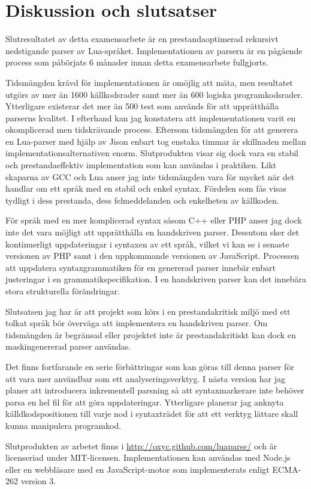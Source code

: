\section{Diskussion och slutsatser}

Slutresultatet av detta examensarbete är en prestandaoptimerad rekursivt
nedstigande parser av Lua-språket. Implementationen av parsern är en pågående
process som påbörjats 6 månader innan detta examensarbete fullgjorts.

Tidsmängden krävd för implementationen är omöjlig att mäta, men resultatet
utgörs av mer än 1600 källkodsrader samt mer än 600 logiska programkodsrader.
Ytterligare existerar det mer än 500 test som används för att upprätthålla
parserns kvalitet. I efterhand kan jag konstatera att implementationen varit
en okomplicerad men tidskrävande process. Eftersom tidsmängden för att
generera en Lua-parser med hjälp av Jison enbart tog enstaka timmar är
skillnaden mellan implementationsalternativen enorm. Slutprodukten visar sig
dock vara en stabil och prestandaeffektiv implementation som kan användas i
praktiken. Likt skaparna av GCC och Lua anser jag inte tidsmängden vara för
mycket när det handlar om ett språk med en stabil och enkel syntax. Fördelen
som fås visas tydligt i dess prestanda, dess felmeddelanden och enkelheten av
källkoden.

För språk med en mer komplicerad syntax såsom C++ eller PHP anser jag dock
inte det vara möjligt att upprätthålla en handskriven parser. Dessutom sker
det kontinuerligt uppdateringar i syntaxen av ett språk, vilket vi kan se i
senaste versionen av PHP samt i den uppkommande versionen av JavaScript.
Processen att uppdatera syntaxgrammatiken för en genererad parser innebär
enbart justeringar i en grammatikspecifikation. I en handskriven parser kan
det innebära stora strukturella förändringar.

Slutsatsen jag har är att projekt som körs i en prestandakritisk miljö med ett
tolkat språk bör överväga att implementera en handskriven parser. Om
tidsmängden är begränsad eller projektet inte är prestandakritiskt kan dock en
maskingenererad parser användas.

Det finns fortfarande en serie förbättringar som kan göras till denna
parser för att vara mer användbar som ett analyseringsverktyg. I nästa version
har jag planer att introducera inkrementell parsning så att syntaxmarkerare
inte behöver parsa en hel fil för att göra uppdateringar. Ytterligare planerar
jag anknyta källdkodspositionen till varje nod i syntaxträdet för att ett
verktyg lättare skall kunna manipulera programkod.

Slutprodukten av arbetet finns i \url{http://oxyc.github.com/luaparse/} och är
licenseriad under MIT-licensen. Implementationen kan användas med Node.js
eller en webbläsare med en JavaScript-motor som implementerats enligt ECMA-262
version 3.

